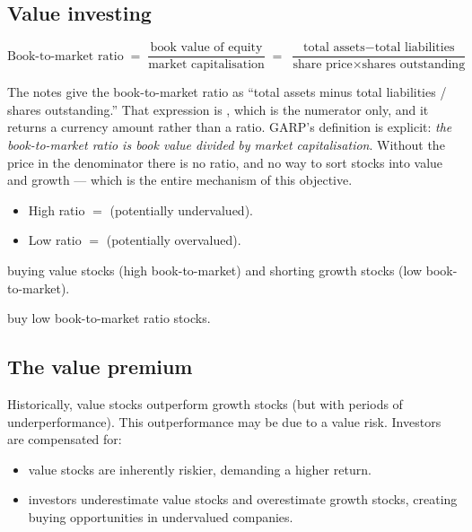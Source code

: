 \subsection{Value investing}

\begin{imfmlbox}
\[ \text{Book-to-market ratio} \;=\; \frac{\text{book value of equity}}{\text{market capitalisation}}
   \;=\; \frac{\text{total assets} - \text{total liabilities}}{\text{share price} \times \text{shares outstanding}} \]
\end{imfmlbox}

\begin{imtrapbox}[title={A missing denominator in the source notes}]
The notes give the book-to-market ratio as ``total assets minus total
liabilities / shares outstanding.'' That expression is , which is the numerator only, and it returns a currency amount rather than
a ratio. GARP's definition is explicit: \emph{the book-to-market ratio is book
value divided by market capitalisation}. Without the price in the denominator
there is no ratio, and no way to sort stocks into value and growth --- which is
the entire mechanism of this objective.
\end{imtrapbox}

\begin{itemize}
\item High ratio $=$  (potentially undervalued).
\item Low ratio $=$  (potentially overvalued).
\end{itemize}

 buying value stocks (high book-to-market) and
shorting growth stocks (low book-to-market).

 buy low book-to-market ratio stocks.

\subsection{The value premium}

Historically, value stocks outperform growth stocks (but with periods of
underperformance). This outperformance may be due to a value risk. Investors are
compensated for:

\begin{itemize}
\item {} value stocks are inherently riskier, demanding
a higher return.
\item {} investors underestimate value stocks and
overestimate growth stocks, creating buying opportunities in undervalued
companies.
\end{itemize}

